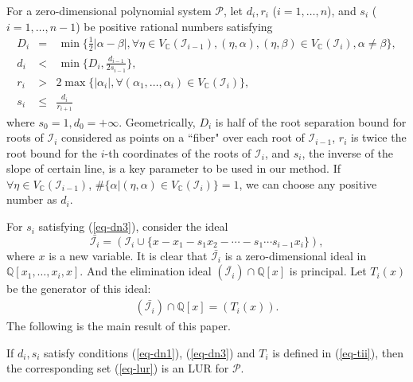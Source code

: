 \documentclass[amsthm]{JSC_LaTex_2007_Mar_12/elsart}
\def\bref#1{(\ref{#1})}
\def\C{{\mathbb{C}}}
\def\Q{{\mathbb{Q}}}
\def\IS{{\mathcal{I}}}
\begin{document}
For a zero-dimensional polynomial system $\mathcal{P}$, let $d_i,
r_{i}$ ($i=1,\ldots,n$), and $s_i$ ($i=1,\ldots,n-1$) be positive
rational numbers satisfying
\begin{eqnarray}
 D_i&=&\,\min\{\frac{1}{2}|\alpha-\beta|, \forall \eta\in V_{\C}(\IS_{i-1}),
   (\eta,\alpha), (\eta,\beta)\in V_{\C}(\IS_i), \alpha\ne\beta\},\label{eq-dn0}\\
d_i&<&\,\min\{D_i, \frac{d_{i-1}}{2s_{i-1}}\},\label{eq-dn1}\\
 r_{i}&>&2\max\{|\alpha_{i}|, \forall (\alpha_1,\ldots,\alpha_{i})\in V_{\C}(\IS_{i}) \}, \label{eq-dn2}\\
 s_i&\le&\frac{d_i}{r_{i+1}}\label{eq-dn3}
\end{eqnarray}
where $s_0=1, d_0 = +\infty$.
Geometrically, $D_i$ is half of the root separation bound for roots
of $\IS_i$ considered as points on a ``fiber" over each root of
$\IS_{i-1}$, $r_i$ is twice the root bound for the $i$-th
coordinates of the roots of $\IS_i$, and $s_i$, the inverse of the
slope of certain line, is a key parameter to be used in our method.
If $\forall \eta\in V_{\C}(\IS_{i-1})$, $\#\{\alpha|(\eta,\alpha)\in
V_{\C}(\IS_i)\}=1$, we can choose any positive number as $d_i$.

For $s_i$ satisfying \bref{eq-dn3}, consider the ideal
\begin{equation}\label{eq-bi}
 \bar{\IS_i} = (\IS_i\cup\{x - x_1 - s_1 x_2 - \cdots -
 s_1\cdots s_{i-1} x_i\}),\end{equation}
 where $x$ is a new variable.
It is clear that $\bar{\IS_i}$ is a zero-dimensional ideal in
$\Q[x_1,\ldots,x_i,x]$. And the elimination ideal
$(\bar{\IS_i})\cap\Q[x]$ is principal. Let $T_i(x)$ be the generator of this
ideal:
\begin{eqnarray}\label{eq-tii}
(\bar{\IS_i})\cap\Q[x] = (T_i(x)).
\end{eqnarray}
The following is the main result of this paper.
\begin{thm}\label{th-1}
If $d_i,  s_i$ satisfy conditions \bref{eq-dn1}, \bref{eq-dn3} and
$T_i$ is defined in \bref{eq-tii}, then the corresponding set
\bref{eq-lur} is an LUR for $\mathcal{P}$.
\end{thm}
\end{document}
